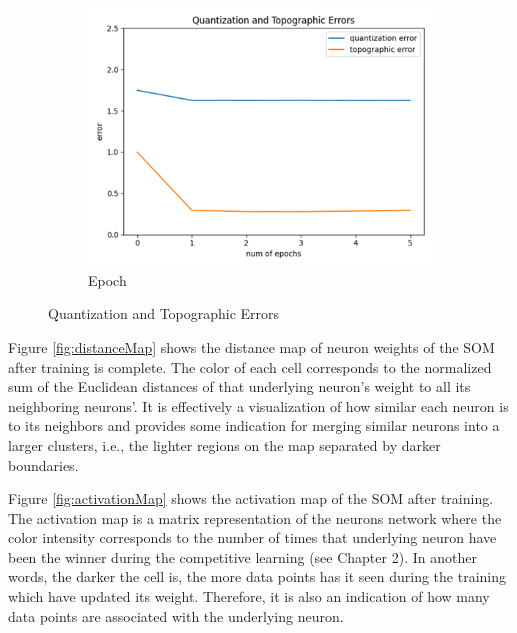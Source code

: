 \begin{figure}
\begin{subfigure}[b]{0.3\textwidth}
         \centering
         \includegraphics[width=\textwidth]{figures/SOM_epochs.png}
         \caption{Epoch}
         \label{fig:epoch}
     \end{subfigure}
        \caption{Quantization and Topographic Errors}
        \label{fig:experiments}
\end{figure}


Figure \ref{fig:distanceMap} shows the distance map of neuron weights of the SOM after training is complete. The color of each cell corresponds to the normalized sum of the Euclidean distances of that underlying neuron's weight to all its neighboring neurons'. It is effectively a visualization of how similar each neuron is to its neighbors and provides some indication for merging similar neurons into a larger clusters, i.e., the lighter regions on the map separated by darker boundaries.  

Figure \ref{fig:activationMap} shows the activation map of the SOM after training. The activation map is a matrix representation of the neurons network where the color intensity corresponds to the number of times that underlying neuron have been the winner during the competitive learning (see Chapter 2). In another words, the darker the cell is, the more data points has it seen during the training which have updated its weight. Therefore, it is also an indication of how many data points are associated with the underlying neuron.  



